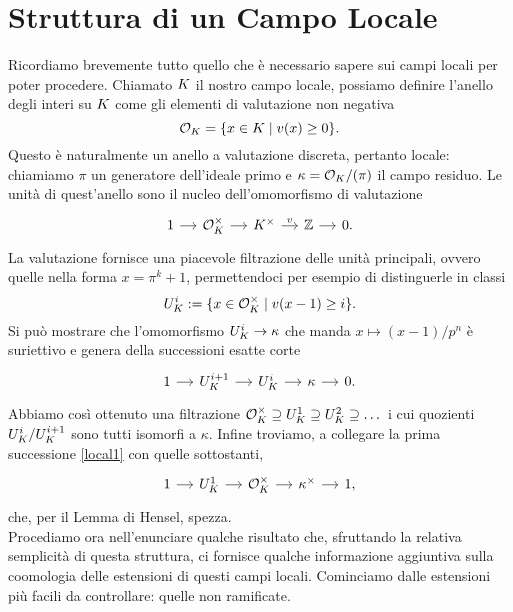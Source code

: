 \section{Struttura di un Campo Locale}
Ricordiamo brevemente tutto quello che è necessario sapere sui campi locali per poter procedere. Chiamato $ K $ il nostro campo locale, possiamo definire l'anello degli interi su $ K $ come gli elementi di valutazione non negativa
\[ \mathcal{O}_{K} = \{ x \in K \mid v(x)\geq 0 \}. \]
Questo è naturalmente un anello a valutazione discreta, pertanto locale: chiamiamo $ \pi $ un generatore dell'ideale primo e $ \kappa = \mathcal{O}_{K}/(\pi) $ il campo residuo. Le unità di quest'anello sono il nucleo dell'omomorfismo di valutazione
\begin{equation}\label{local1}
	\begin{tikzcd}[column sep = small]
	1 \rar
	& \mathcal{O}_{\K}^\times \rar
	& \K^\times \rar["v"]
	& \Z \rar
	& 0.
	\end{tikzcd}
\end{equation}
La valutazione fornisce una piacevole filtrazione delle unità  principali, ovvero quelle nella forma $ x = \pi^k +1 $, permettendoci per esempio di distinguerle in classi  $$  U_{K}^i :=\{x \in \mathcal{O}_{K}^\times \mid v(x-1) \geq i \}.  $$ Si può mostrare che l'omomorfismo $ U_{K}^i \to \kappa $ che manda $ x \mapsto (x-1)/p^n $ è suriettivo e genera della successioni esatte corte
\begin{equation}\label{local2}
\begin{tikzcd}[column sep = small]
1 \rar
& U_K^{i+1} \rar
& U_{K}^i \rar
& \kappa \rar
& 0.
\end{tikzcd}
\end{equation}
Abbiamo così ottenuto una filtrazione $ \mathcal{O}_{K}^\times \supseteq U_{K}^1 \supseteq U_{K}^2 \supseteq \dots $ 
i cui quozienti $ U_{K}^i / U_{K}^{i+1} $ sono tutti isomorfi a $ \kappa $.
Infine troviamo, a collegare la prima successione \eqref{local1} con quelle sottostanti, 
\begin{equation}\label{local3}
	\begin{tikzcd}[column sep = small]
	1 \rar
	& U_K^{1} \rar
	& \mathcal{O}_{\K}^\times \rar
	& \kappa^\times \rar
	&1,
	\end{tikzcd}
\end{equation}
che, per il Lemma di Hensel, spezza.\\

Procediamo ora nell'enunciare qualche risultato che, sfruttando la relativa semplicità di questa struttura, ci fornisce qualche informazione aggiuntiva sulla coomologia delle estensioni di questi campi locali. Cominciamo dalle estensioni più facili da controllare: quelle non ramificate.

